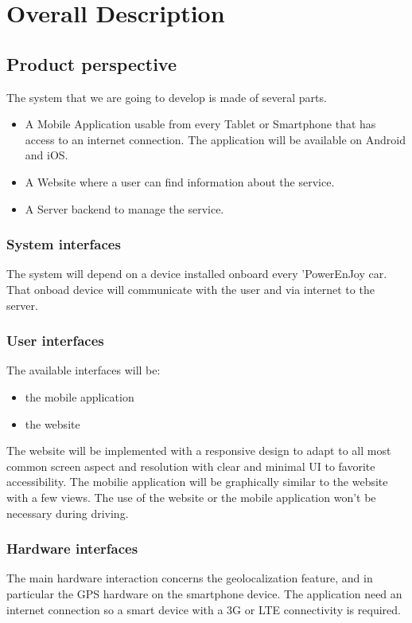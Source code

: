 \section{Overall Description}



\subsection{Product perspective}
The system that we are going to develop is made of several parts. 
\begin{itemize}
	\item A Mobile Application usable from every Tablet or Smartphone that has access to an internet connection. The application will be available on Android and iOS. 
	\item A Website where a user can find information about the service.
	\item A Server backend to manage the service.
\end{itemize}

\subsubsection{System interfaces}
The system will depend on a device installed onboard every 'PowerEnJoy car. That onboad device will communicate with the user and via internet to the server.

\subsubsection{User interfaces}
The available interfaces will be:
\begin{itemize}
	\item the mobile application
	\item the website
\end{itemize}
The website will be implemented with a responsive design to adapt to all most common screen aspect and resolution with clear and minimal UI to favorite accessibility.
The mobilie application will be graphically similar to the website with a few views.
The use of the website or the mobile application won't be necessary during driving. 

\subsubsection{Hardware interfaces}
The main hardware interaction concerns the geolocalization feature, and in particular the GPS hardware on the smartphone device.
The application need an internet connection so a smart device with a 3G or LTE connectivity is required.


